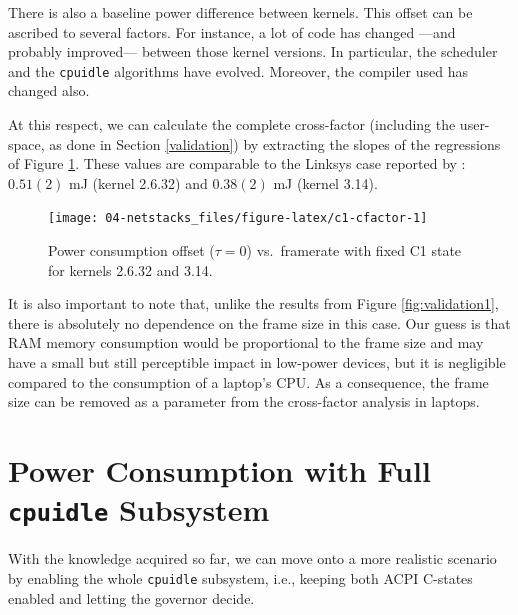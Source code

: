 \documentclass[twoside,nohyper]{tufte-book}
\begin{document}
There is also a baseline power difference between kernels. This offset can be ascribed to several factors. For instance, a lot of code has changed ---and probably improved--- between those kernel versions. In particular, the scheduler and the \texttt{cpuidle} algorithms have evolved. Moreover, the compiler used has changed also.

At this respect, we can calculate the complete cross-factor (including the user-space, as done in Section \ref{validation}) by extracting the slopes of the regressions of Figure \ref{fig:c1-cfactor}. These values are comparable to the Linksys case reported by \citet{Serrano2014}: \(0.51(2)\) mJ (kernel 2.6.32) and \(0.38(2)\) mJ (kernel 3.14).



\begin{figure}

{\centering \texttt{[image: 04-netstacks\_files/figure-latex/c1-cfactor-1]} 

}

\caption[Power consumption offset (\(\tau=0\)) vs.~framerate with fixed C1 state for kernels 2.6.32 and 3.14.]{Power consumption offset (\(\tau=0\)) vs.~framerate with fixed C1 state for kernels 2.6.32 and 3.14.}\label{fig:c1-cfactor}
\end{figure}

It is also important to note that, unlike the results from Figure \ref{fig:validation1}, there is absolutely no dependence on the frame size in this case. Our guess is that RAM memory consumption would be proportional to the frame size and may have a small but still perceptible impact in low-power devices, but it is negligible compared to the consumption of a laptop's CPU. As a consequence, the frame size can be removed as a parameter from the cross-factor analysis in laptops.

\hypertarget{power-consumption-with-full-cpuidle-subsystem}{%
\section{\texorpdfstring{Power Consumption with Full \texttt{cpuidle} Subsystem}{Power Consumption with Full cpuidle Subsystem}}\label{power-consumption-with-full-cpuidle-subsystem}}

With the knowledge acquired so far, we can move onto a more realistic scenario by enabling the whole \texttt{cpuidle} subsystem, i.e., keeping both ACPI C-states enabled and letting the governor decide.
\end{document}
